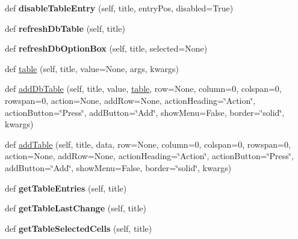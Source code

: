 \begin{DoxyCompactItemize}
\item 
\mbox{\label{classappjar_1_1gui_a2c6178651307b3480e4912189f77ed72}} 
def {\bfseries disable\+Table\+Entry} (self, title, entry\+Pos, disabled=True)
\item 
\mbox{\label{classappjar_1_1gui_a2ae49065f8a7d87cdeebc059728d8a48}} 
def {\bfseries refresh\+Db\+Table} (self, title)
\item 
\mbox{\label{classappjar_1_1gui_a88ce34d72f9e452e60a8cbf206b60774}} 
def {\bfseries refresh\+Db\+Option\+Box} (self, title, selected=None)
\item 
def \hyperlink{classappjar_1_1gui_a137fe094086a1e996bdbcb8bb56c20ae}{table} (self, title, value=None, args, kwargs)
\item 
def \hyperlink{classappjar_1_1gui_ae6fe0ecc7adf9eaf1c0d205d30b94e05}{add\+Db\+Table} (self, title, value, \hyperlink{classappjar_1_1gui_a137fe094086a1e996bdbcb8bb56c20ae}{table}, row=None, column=0, colspan=0, rowspan=0, action=None, add\+Row=None, action\+Heading=\char`\"{}Action\char`\"{}, action\+Button=\char`\"{}Press\char`\"{}, add\+Button=\char`\"{}Add\char`\"{}, show\+Menu=False, border=\char`\"{}solid\char`\"{}, kwargs)
\item 
def \hyperlink{classappjar_1_1gui_a35b300980afd1ca2cb3b5f6396160459}{add\+Table} (self, title, data, row=None, column=0, colspan=0, rowspan=0, action=None, add\+Row=None, action\+Heading=\char`\"{}Action\char`\"{}, action\+Button=\char`\"{}Press\char`\"{}, add\+Button=\char`\"{}Add\char`\"{}, show\+Menu=False, border=\char`\"{}solid\char`\"{}, kwargs)
\item 
\mbox{\label{classappjar_1_1gui_a6f5ea25b93f0db8e65368a6d105a77fa}} 
def {\bfseries get\+Table\+Entries} (self, title)
\item 
\mbox{\label{classappjar_1_1gui_ac387fdc795d513b1ba2bc48dc0f86503}} 
def {\bfseries get\+Table\+Last\+Change} (self, title)
\item 
\mbox{\label{classappjar_1_1gui_ac2dfd1561abc92b7ec8d440cd448abc7}} 
def {\bfseries get\+Table\+Selected\+Cells} (self, title)
\item 
\mbox{\label{classappjar_1_1gui_a4897eac5dd879965f3ecff72ada9c866}} 

\end{DoxyCompactItemize}
